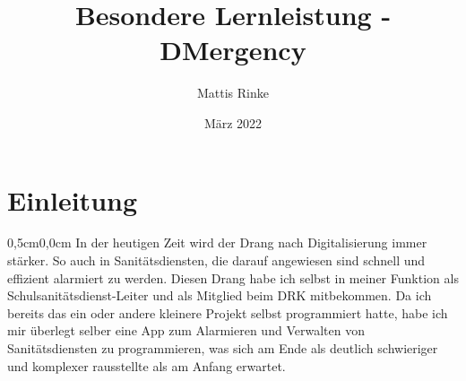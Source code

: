 \documentclass{article}
\begin{document}
\title{Besondere Lernleistung - DMergency}

\author{Mattis Rinke}

\date{März 2022}


\newpage
\tableofcontents
\newpage

\section{Einleitung}

\begin{changemargin}{0,5cm}{0,0cm} 
    In der heutigen Zeit wird der Drang nach Digitalisierung immer stärker. So auch in Sanitätsdiensten, die darauf angewiesen sind schnell und effizient alarmiert zu werden.
    Diesen Drang habe ich selbst in meiner Funktion als Schulsanitätsdienst-Leiter und als Mitglied beim DRK mitbekommen. Da ich bereits das ein oder andere kleinere Projekt selbst 
    programmiert hatte, habe ich mir überlegt selber eine App zum Alarmieren und Verwalten von Sanitätsdiensten zu programmieren, was sich am Ende als deutlich schwieriger und komplexer 
    rausstellte als am Anfang erwartet.

\end{changemargin}
\end{document}
